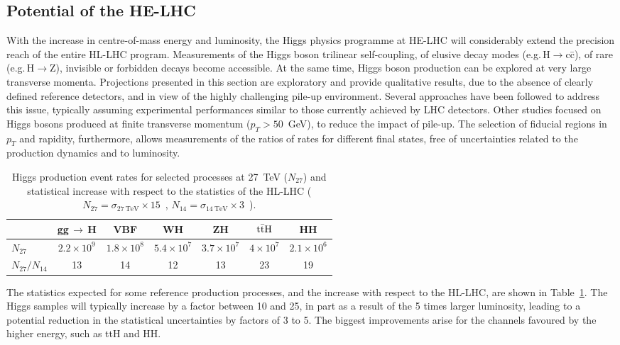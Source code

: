 \documentclass[../report.tex]{subfiles}
\begin{document}
\subsection{Potential of the HE-LHC}
With the increase in centre-of-mass energy and luminosity, the Higgs physics programme at HE-LHC will considerably extend the precision reach of the entire HL-LHC program. Measurements of the Higgs boson trilinear self-coupling, of elusive decay modes (e.g.\,H$\to$c\={c}), of rare (e.g.\,H$\to$Z\textgamma), invisible or forbidden decays become accessible. At the same time, Higgs boson production can be explored at very large transverse momenta.
Projections presented in this section are exploratory and provide qualitative results, due to the absence of clearly defined reference detectors, and in view of the highly challenging pile-up environment. Several approaches have been followed to address this issue, typically assuming experimental performances similar to those currently achieved by LHC detectors. Other studies focused on Higgs bosons produced at finite transverse momentum ($p_T>50$~GeV), to reduce the impact of pile-up. The selection of fiducial regions in $p_T$ and rapidity, furthermore, allows measurements of the ratios of rates for different final states, free of uncertainties related to the production dynamics and to luminosity. 

\begin{table}[h]
\centering
  \caption{\label{tab:Hrates}
Higgs production event rates for selected processes
    at 27~TeV ($N_{27}$) and
 statistical increase with 
 respect to the statistics of the HL-LHC ($N_{27}=\sigma_{27~\mathrm{TeV}} \times 15$~\iab, 
 $N_{14}=\sigma_{14~\mathrm{TeV}} \times 3$~\iab).} 
\begin{tabular}{|l|c|c|c|c|c|c|} 
\hline  \hline
&  gg\,$\to$\,H   & VBF &
 WH  &
 ZH  &
 $\rm t\bar{t}H$ &
 HH 
 \\ \hline
$N_{27}$  & $2.2\times 10^9$ & $1.8\times 10^8$ & $5.4\times 10^7$ & $3.7\times
 10^7$ &  $4\times 10^7$ & $2.1 \times 10^6$  \\
$N_{27}/N_{14}$ & 13 & 14 & 12 & 13 &23 & 19
\\ \hline
\hline
\end{tabular}
\end{table}
The statistics expected for some reference production processes, and the increase with respect to the HL-LHC, are shown in
Table~\ref{tab:Hrates}. The Higgs samples will typically increase by a factor between 10 and 25, in part as a result of the 5 times larger luminosity, leading to a potential reduction in the statistical uncertainties by factors of 3 to 5. The biggest improvements arise for the channels favoured by the higher energy, such as ttH and HH.
\end{document}
